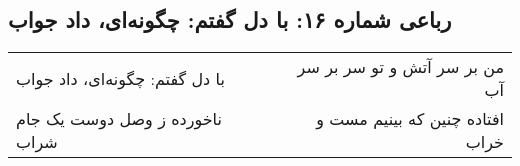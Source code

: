 \begin{center}
\section*{رباعی شماره ۱۶: با دل گفتم: چگونه‌ای، داد جواب}
\label{sec:sh016}
\begin{longtable}{l p{0.5cm} r}
با دل گفتم: چگونه‌ای، داد جواب
&&
من بر سر آتش و تو سر بر سر آب
\\
ناخورده ز وصل دوست یک جام شراب
&&
افتاده چنین که بینیم مست و خراب
\\
\end{longtable}
\end{center}

